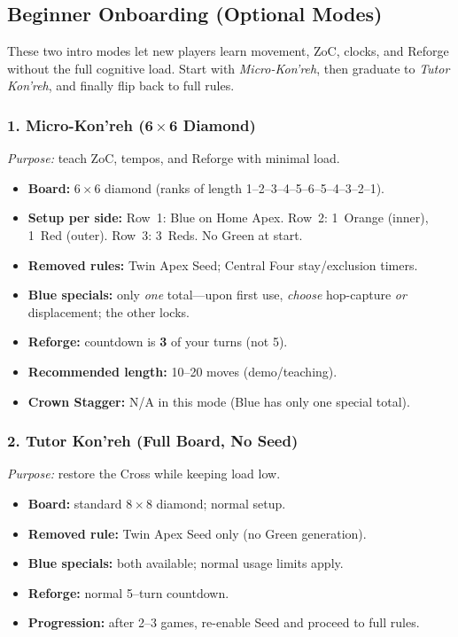 \documentclass[11pt]{article}
\begin{document}
\clearpage
\subsection{Beginner Onboarding (Optional Modes)}
\label{sec:onboarding}

\noindent These two intro modes let new players learn movement, ZoC, clocks, and Reforge without the full cognitive load. Start with \emph{Micro-Kon'reh}, then graduate to \emph{Tutor Kon'reh}, and finally flip back to full rules.

\subsubsection*{1. Micro-Kon'reh (6\,$\times$\,6 Diamond)}
\textit{Purpose:} teach ZoC, tempos, and Reforge with minimal load.
\begin{itemize}[leftmargin=1.3em]
  \item \textbf{Board:} 6\,$\times$\,6 diamond (ranks of length 1–2–3–4–5–6–5–4–3–2–1).
  \item \textbf{Setup per side:} Row~1: Blue on Home Apex. Row~2: 1~Orange (inner), 1~Red (outer). Row~3: 3~Reds. No Green at start.
  \item \textbf{Removed rules:} Twin Apex Seed; Central Four stay/exclusion timers.
  \item \textbf{Blue specials:} only \emph{one} total—upon first use, \emph{choose} hop-capture \emph{or} displacement; the other locks.
  \item \textbf{Reforge:} countdown is \textbf{3} of your turns (not 5).
  \item \textbf{Recommended length:} 10–20 moves (demo/teaching).
  \item \textbf{Crown Stagger:} \textsc{N/A} in this mode (Blue has only one special total).
\end{itemize}

\subsubsection*{2. Tutor Kon'reh (Full Board, No Seed)}
\textit{Purpose:} restore the Cross while keeping load low.
\begin{itemize}[leftmargin=1.3em]
  \item \textbf{Board:} standard 8\,$\times$\,8 diamond; normal setup.
  \item \textbf{Removed rule:} Twin Apex Seed only (no Green generation).
  \item \textbf{Blue specials:} both available; normal usage limits apply.
  \item \textbf{Reforge:} normal 5–turn countdown.
  \item \textbf{Progression:} after 2–3 games, re-enable Seed and proceed to full rules.
\end{itemize}
\end{document}
